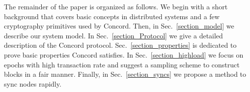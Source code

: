 The remainder of the paper is organized as follows. We begin with a short background that covers basic concepts in distributed systems and a few cryptography primitives used by Concord. Then, in Sec.~\ref{section_model} we describe our system model. In Sec.~\ref{section_Protocol} we give a detailed description of the Concord protocol. Sec.~\ref{section_properties} is dedicated to prove basic properties Concord satisfies. In Sec.~\ref{section_highload} we focus on epochs with high transaction rate and suggest a sampling scheme to construct blocks in a fair manner. Finally, in Sec.~\ref{section_syncs} we propose a method to sync nodes rapidly. 





